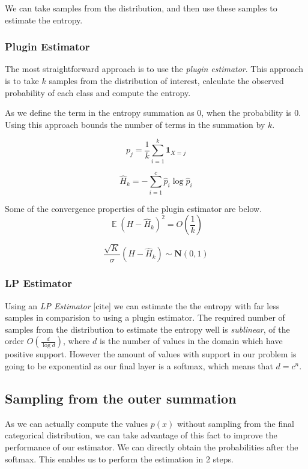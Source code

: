 \documentclass[12pt, a4paper]{report}
\theoremstyle{definition}
\DeclareMathOperator{\E}{\mathbb{E}}
\begin{document}
We can take samples from the distribution, and then use these samples to estimate the entropy.



\subsubsection{Plugin Estimator}
The most straightforward approach is to use the \textit{plugin estimator}. This approach is to take $k$ samples from the distribution of interest, calculate the observed probability of each class and compute the entropy.

As we define the term in the entropy summation as $0$, when the probability is $0$. Using this approach bounds the number of terms in the summation by $k$.

$$p_j = \frac{1}{k} \sum_{i=1}^k \mathbf{1}_{X = j} $$

$$\hat{H}_k = - \sum_{i=1}^{c} \hat{p}_i \log{\hat{p}_i}$$


Some of the convergence properties of the plugin estimator are below.
$$\E \left(H - \hat{H}_k \right)^2 = O \left ( \frac{1}{k} \right) $$

$$ \frac{\sqrt{K}}{\sigma} \left(H - \hat{H}_k \right) \sim \mathbf{N} \left(0, 1 \right) $$



\subsubsection{LP Estimator}

Using an \textit{LP Estimator} [cite] we can estimate the the entropy with far less samples in comparision to using a plugin estimator. The required number of samples from the distribution to estimate the entropy well is \textit{sublinear}, of the order $O \left( \frac{d}{\log{d}}\right)$, where $d$ is the number of values in the domain which have positive support. However the amount of values with support in our problem is going to be exponential as our final layer is a softmax, which means that $d = c^n$.


\subsection{Sampling from the outer summation}

As we can actually compute the values $p(x)$ without sampling from the final categorical distribution, we can take advantage of this fact to improve the performance of our estimator. We can directly obtain the probabilities after the softmax. This enables us to perform the estimation in 2 steps.
\end{document}
